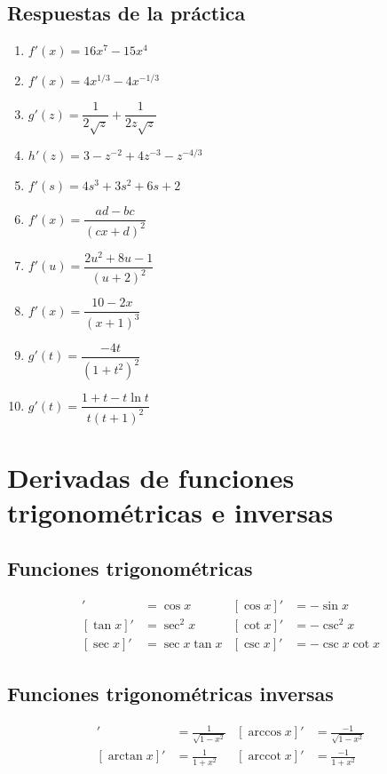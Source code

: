 \documentclass[12pt]{article}
\begin{document}
\subsection{Respuestas de la práctica}
\begin{enumerate}
    \item $f'(x) = 16x^7 - 15x^4$
    \item $f'(x) = 4x^{1/3} - 4x^{-1/3}$
    \item $g'(z) = \dfrac{1}{2\sqrt{z}} + \dfrac{1}{2z\sqrt{z}}$
    \item $h'(z) = 3 - z^{-2} + 4z^{-3} - z^{-4/3}$
    \item $f'(s) = 4s^3 + 3s^2 + 6s + 2$
    \item $f'(x) = \dfrac{ad - bc}{(cx + d)^2}$
    \item $f'(u) = \dfrac{2u^2 + 8u - 1}{(u + 2)^2}$
    \item $f'(x) = \dfrac{10 - 2x}{(x + 1)^3}$
    \item $g'(t) = \dfrac{-4t}{(1 + t^2)^2}$
    \item $g'(t) = \dfrac{1 + t - t\ln t}{t(t + 1)^2}$
\end{enumerate}

\section{Derivadas de funciones trigonométricas e inversas}

\subsection{Funciones trigonométricas}
\begin{align*}
[\sin x]' &= \cos x & [\cos x]' &= -\sin x \\
[\tan x]' &= \sec^2 x & [\cot x]' &= -\csc^2 x \\
[\sec x]' &= \sec x \tan x & [\csc x]' &= -\csc x \cot x
\end{align*}

\subsection{Funciones trigonométricas inversas}
\begin{align*}
[\arcsin x]' &= \frac{1}{\sqrt{1 - x^2}} & [\arccos x]' &= \frac{-1}{\sqrt{1 - x^2}} \\
[\arctan x]' &= \frac{1}{1 + x^2} & [\operatorname{arccot} x]' &= \frac{-1}{1 + x^2}
\end{align*}
\end{document}
